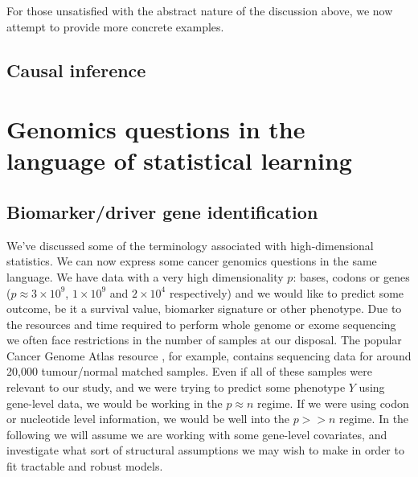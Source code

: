 \documentclass[thesis.tex]{subfiles}
\begin{document}
For those unsatisfied with the abstract nature of the discussion above, we now attempt to provide more concrete examples.

\subsection{Causal inference}

\section{Genomics questions in the language of statistical learning}

\subsection{Biomarker/driver gene identification}
We've discussed some of the terminology associated with high-dimensional statistics. We can now express some cancer genomics questions in the same language. We have data with a very high dimensionality $p$: bases, codons or genes ($p \approx 3\times 10^9$, $1 \times 10^9$ and $2 \times 10^4$ respectively) and we would like to predict some outcome, be it a survival value, biomarker signature or other phenotype. Due to the resources and time required to perform whole genome or exome sequencing we often face restrictions in the number of samples at our disposal. The popular Cancer Genome Atlas resource \citep{weinstein_cancer_2013}, for example, contains sequencing data for around 20,000 tumour/normal matched samples. Even if all of these samples were relevant to our study, and we were trying to predict some phenotype $Y$ using gene-level data, we would be working in the $p \approx n$ regime. If we were using codon or nucleotide level information, we would be well into the $p >> n$ regime. In the following we will assume we are working with some gene-level covariates, and investigate what sort of structural assumptions we may wish to make in order to fit tractable and robust models. 
\end{document}
